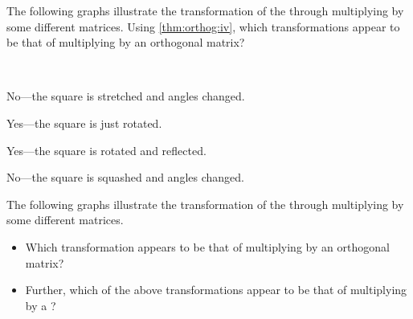 \begin{example} 
The following graphs illustrate the transformation of the  through multiplying by some different matrices. 
Using \cref{thm:orthog:iv}, which transformations appear to be that of multiplying by an orthogonal matrix?
\begin{Parts}
\item {}
\item {}
\item {}
\item {}
\end{Parts}

\begin{solution} \ 
\begin{Parts}
\item No---the square is stretched and angles changed.
\item Yes---the square is just rotated.
\item Yes---the square is rotated and reflected.
\item No---the square is squashed and angles changed.
\end{Parts}
\end{solution}
\end{example}



\begin{activity}
The following graphs illustrate the transformation of the  through multiplying by some different matrices. 
\begin{itemize}
\item Which transformation appears to be that of multiplying by an orthogonal matrix?
\actposs{\TwoD{-0.85}{-0.52}{-0.52}{0.85}}
{}
{}
{}
\item Further, which of the above transformations appear to be that of multiplying by a ?
\end{itemize}
\end{activity}





